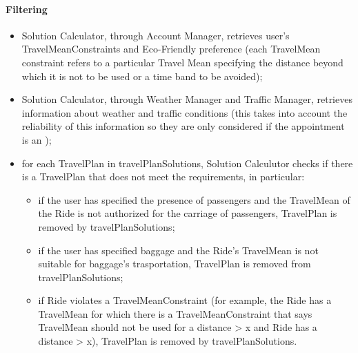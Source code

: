 	\paragraph{Filtering}
	\begin{itemize}
		\item Solution Calculator, through Account Manager, retrieves user's TravelMeanConstraints and Eco-Friendly preference (each TravelMean constraint refers to a particular Travel Mean specifying the distance beyond which it is not to be used or a time band to be avoided);

		\item Solution Calculator, through Weather Manager and Traffic Manager, retrieves information about weather and traffic conditions (this takes into account the reliability of this information so they are only considered if the appointment is an );
		
		\item  for each TravelPlan in travelPlanSolutions, Solution Calculutor checks if there is a TravelPlan that does not meet the requirements, in particular: 
		
		\begin{itemize}	
			\item if the user has specified the presence of passengers and the TravelMean of the Ride is not authorized for the carriage of passengers, TravelPlan is removed by travelPlanSolutions;
			
			\item if the user has specified baggage and the Ride's TravelMean is not suitable for baggage's trasportation, TravelPlan is removed from travelPlanSolutions;
			
			\item if Ride violates a TravelMeanConstraint (for example, the Ride has a TravelMean for which there is a TravelMeanConstraint that says TravelMean should not be used for a distance > x and Ride has a distance > x), TravelPlan is removed by travelPlanSolutions. 
		\end{itemize}
		
		\end{itemize}
	
	
	
